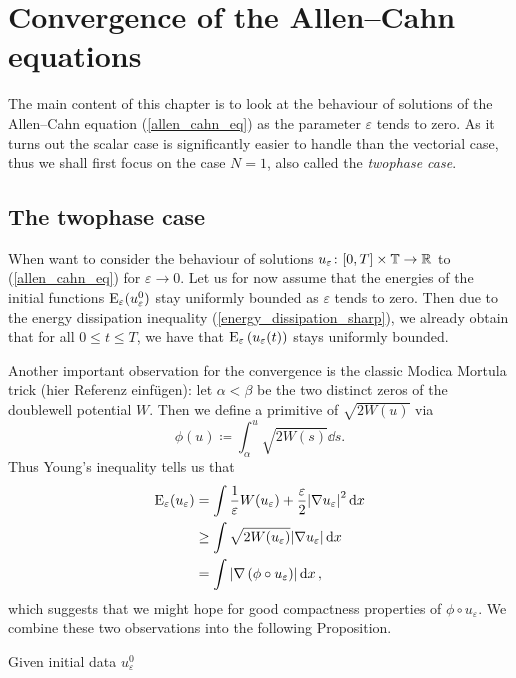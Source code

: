\chapter{Convergence of the Allen--Cahn equations}

The main content of this chapter is to look at the behaviour of solutions of the Allen--Cahn equation (\ref{allen_cahn_eq}) as the parameter $ \varepsilon $ tends to zero. As it turns out the scalar case is significantly easier to handle than the vectorial case, thus we shall first focus on the case $ N = 1 $,
also called the \emph{twophase case}.

\section{The twophase case}

When want to consider the behaviour of solutions $ u_{ \varepsilon} \colon [0, T] \times \operatorname{\mathbb{T}} \to \mathbb{ R } $ to (\ref{allen_cahn_eq}) for $ \varepsilon \to 0 $. Let us for now assume that the energies of the initial functions $ \operatorname{E}_{ \varepsilon } ( u_{ \varepsilon }^{ 0 } ) $ stay uniformly bounded as $ \varepsilon $ tends to zero. 
Then due to the energy dissipation inequality (\ref{energy_dissipation_sharp}), we already obtain that for all
$ 0 \leq t \leq T $, we have that $ \operatorname{E}_{ \varepsilon } \left( u_{\varepsilon } ( t ) \right) $ stays uniformly  bounded.

Another important observation for the convergence is the classic Modica Mortula trick (hier Referenz einfügen): let $ \alpha < \beta $ be the two distinct zeros of the doublewell potential $ W $.
Then we define a primitive of $ \sqrt{ 2 W ( u ) } $ via
\begin{equation*}
	\phi ( u ) 
	\coloneqq
	\int_{ \alpha }^{ u }
		\sqrt{ 2 W ( s ) }
	\dd{ s }.
\end{equation*}
Thus Young's inequality tells us that
\begin{align*}
	\operatorname{E}_{ \varepsilon } ( u_{ \varepsilon } )
	& =
	\int
		\frac{ 1 }{ \varepsilon }
		W ( u_{ \varepsilon } ) 
		+
		\frac{ \varepsilon }{ 2 }
		\abs{ \nabla u_{ \varepsilon } }^{ 2 }
	\dd{ x }
	\\
	& \geq
	\int
		\sqrt{ 2 W ( u_{ \varepsilon } ) }
		\abs{ \nabla u_{ \varepsilon } }
	\dd{ x }
	\\
	& =
	\int
		\abs{ \nabla \left( \phi \circ u_{ \varepsilon } \right) }
	\dd{ x },
\end{align*}
which suggests that we might hope for good compactness properties of $ \phi \circ u_{ \varepsilon } $.
We combine these two observations into the following Proposition.

\begin{proposition}
	Given initial data $ u_{ \varepsilon }^{ 0 } $ 
\end{proposition}
